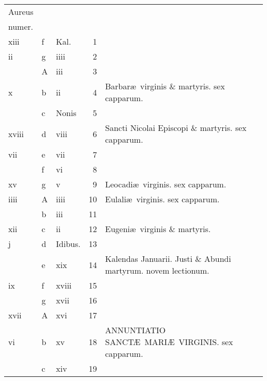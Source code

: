 \documentclass[openany]{book}
\begin{document}
\begin{center}
\begin{tabular}{l | l | l | r | l r}
\color{Red}Aureus & & & & \color{Red} \\
\color{Red}numer. & & & & \color{Red} \\
\color{Red} xiii & f & \color{Red} Kal. & 1 & & \color{Red} \\
\color{Red} ii & g & \color{Red} iiii & 2 & & \color{Red} \\
\color{Red}  & \color{Red} A & \color{Red} iii & 3 & & \color{Red} \\
\color{Red} x & b & \color{Red} ii & 4 & Barbar\ae \ virginis \& martyris. \color{Red} sex capparum. & \color{Red} \\
\color{Red}  & c & Nonis & 5 & & \color{Red} \\
\color{Red} xviii & d & \color{Red} viii & 6 & Sancti Nicolai Episcopi \& martyris. \color{Red} sex capparum. & \color{Red} \\
\color{Red} vii & e & \color{Red} vii & 7 & & \color{Red} \\
\color{Red}  & f & \color{Red} vi & 8 & & \color{Red} \\
\color{Red} xv & g & \color{Red} v & 9 & \color{Red} Leocadi\ae \ virginis. \color{black} sex capparum. & \color{Red} \\
\color{Red} iiii & \color{Red} A & \color{Red} iiii & 10 & \color{Red} Eulali\ae \ virginis. \color{black} sex capparum. & \color{Red} \\
\color{Red}  & b & \color{Red} iii & 11 & & \color{Red} \\
\color{Red} xii & c & \color{Red} ii & 12 & Eugeni\ae \ virginis \& martyris. & \color{Red} \\
\color{Red} j & d & Idibus. & 13 & & \color{Red} \\
\color{Red}  & e & \color{Red} xix & 14 & \qquad \color{Red} Kalendas Januarii. \color{black} Justi \& Abundi martyrum. \color{Red} novem lectionum. & \color{Red} \\
\color{Red} ix & f & \color{Red} xviii & 15 & & \color{Red} \\
\color{Red}  & g & \color{Red} xvii & 16 & & \color{Red} \\
\color{Red} xvii & \color{Red} A & \color{Red} xvi & 17 & & \color{Red} \\
\color{Red} vi & b & \color{Red} xv & 18 & ANNUNTIATIO SANCT\AE \ MARI\AE \ VIRGINIS. \color{Red} sex capparum. & \color{Red} \\
\color{Red}  & c & \color{Red} xiv & 19 & & \color{Red} \\

\end{tabular}
\end{center}
\end{document}
